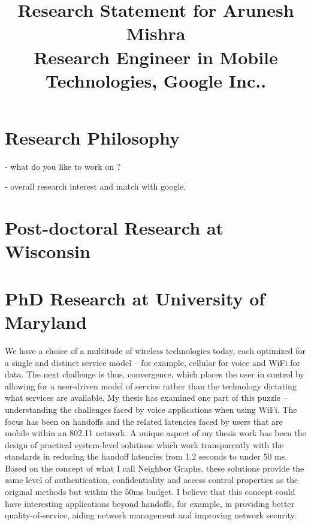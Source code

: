 \documentclass[11pt,letterpaper]{article}
\title{
\vspace{-2cm}Research Statement for Arunesh Mishra\\
{\large Research Engineer in Mobile Technologies, Google Inc..}}
\begin{document}
\date{}
\maketitle
\vspace{-1cm}
\section*{Research Philosophy}
- what do you like to work on ? 

- overall research interest and match with google.

\section*{Post-doctoral Research at Wisconsin}
\section*{PhD Research at University of Maryland}

We have a choice of a multitude of wireless technologies today, each optimized for a single and distinct service model -- for example, cellular for
voice and WiFi for data. The next challenge is thus, convergence, which places the user in control  by 
allowing for a user-driven model of service rather than the technology dictating what services are available. My thesis has examined one part of this puzzle --
understanding the challenges faced by voice applications when using WiFi. The focus has been on handoffs and the related
latencies faced by users that are mobile within an 802.11 network. A unique aspect of my thesis work has been the design of
practical system-level solutions which work transparently with the standards in reducing the handoff latencies from 1.2
seconds to under 50 ms. Based on the concept of what I call Neighbor Graphs, these solutions provide the same level of 
authentication, confidentiality and access control properties as the original methods but within the 50ms budget. I believe that this
concept could have interesting applications beyond handoffs, for example, in providing better quality-of-service, aiding
network management and improving network security. 
\end{document}
